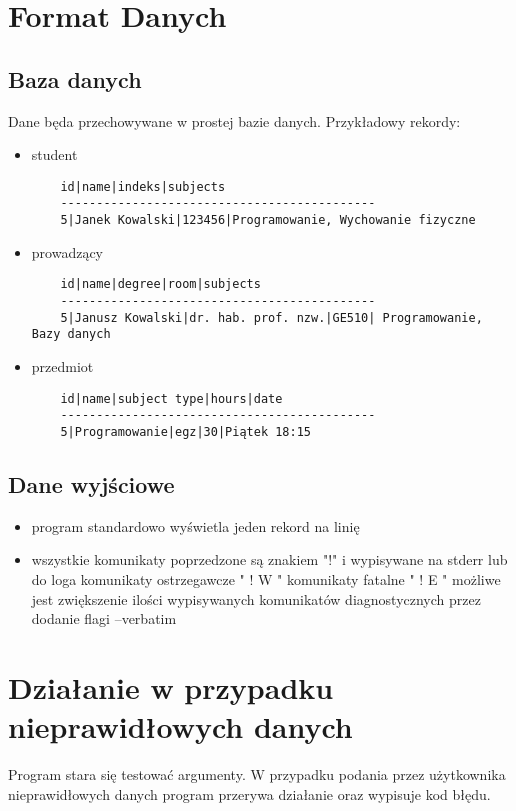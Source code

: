 \documentclass[bibtotocnumbered, headsepline,normalheadings,12pt,polish]{scrreprt}
\begin{document}
\section{Format Danych}
\subsection{Baza danych}
Dane będa przechowywane w prostej bazie danych. Przykładowy rekordy:\\
\begin{itemize}
\normalsize
\item student
\begin{verbatim}
    id|name|indeks|subjects
    --------------------------------------------
    5|Janek Kowalski|123456|Programowanie, Wychowanie fizyczne
\end{verbatim}
\item prowadzący
\begin{verbatim}
    id|name|degree|room|subjects
    --------------------------------------------
    5|Janusz Kowalski|dr. hab. prof. nzw.|GE510| Programowanie, Bazy danych
\end{verbatim}
\item przedmiot
\begin{verbatim}
    id|name|subject type|hours|date
    --------------------------------------------
    5|Programowanie|egz|30|Piątek 18:15
\end{verbatim}
\end{itemize}
\subsection{Dane wyjściowe}
\large
\begin{itemize}
\item program standardowo wyświetla jeden rekord na linię
\item wszystkie komunikaty poprzedzone są znakiem "!" i wypisywane na stderr lub do loga
\subitem * komunikaty ostrzegawcze " ! W "
\subitem * komunikaty fatalne      " ! E "
\subitem * możliwe jest zwiększenie ilości wypisywanych komunikatów diagnostycznych przez dodanie flagi --verbatim
\end{itemize}

\section{Działanie w przypadku nieprawidłowych danych}
Program stara się testować argumenty. W przypadku podania przez użytkownika nieprawidłowych danych program przerywa działanie oraz wypisuje kod błędu.
\end{document}

